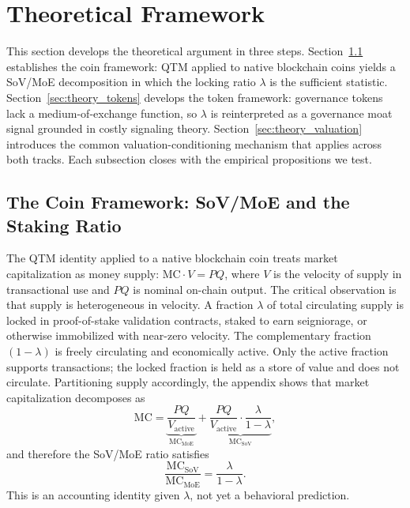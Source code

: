 \documentclass[12pt]{article}
\begin{document}
\section{Theoretical Framework}
\label{sec:theory}

This section develops the theoretical argument in three steps. Section~\ref{sec:theory_coins}
establishes the coin framework: QTM applied to native blockchain coins yields a SoV/MoE
decomposition in which the locking ratio $\lambda$ is the sufficient statistic.
Section~\ref{sec:theory_tokens} develops the token framework: governance tokens lack a
medium-of-exchange function, so $\lambda$ is reinterpreted as a governance moat signal
grounded in costly signaling theory. Section~\ref{sec:theory_valuation} introduces the
common valuation-conditioning mechanism that applies across both tracks. Each subsection
closes with the empirical propositions we test.

\subsection{The Coin Framework: SoV/MoE and the Staking Ratio}
\label{sec:theory_coins}

The QTM identity applied to a native blockchain coin treats market capitalization as
money supply: $\text{MC} \cdot V = PQ$, where $V$ is the velocity of supply in
transactional use and $PQ$ is nominal on-chain output. The critical observation is that
supply is heterogeneous in velocity. A fraction $\lambda$ of total circulating supply is
locked in proof-of-stake validation contracts, staked to earn seigniorage, or otherwise
immobilized with near-zero velocity. The complementary fraction $(1-\lambda)$ is freely
circulating and economically active. Only the active fraction supports transactions;
the locked fraction is held as a store of value and does not circulate. Partitioning
supply accordingly, the appendix shows that market capitalization decomposes as
\[
\text{MC} = \underbrace{\frac{PQ}{V_{\text{active}}}}_{\text{MC}_{\text{MoE}}} + \underbrace{\frac{PQ}{V_{\text{active}}} \cdot \frac{\lambda}{1-\lambda}}_{\text{MC}_{\text{SoV}}},
\]
and therefore the SoV/MoE ratio satisfies
\[
\frac{\text{MC}_{\text{SoV}}}{\text{MC}_{\text{MoE}}} = \frac{\lambda}{1-\lambda}.
\]
This is an accounting identity given $\lambda$, not yet a behavioral prediction.
\end{document}

